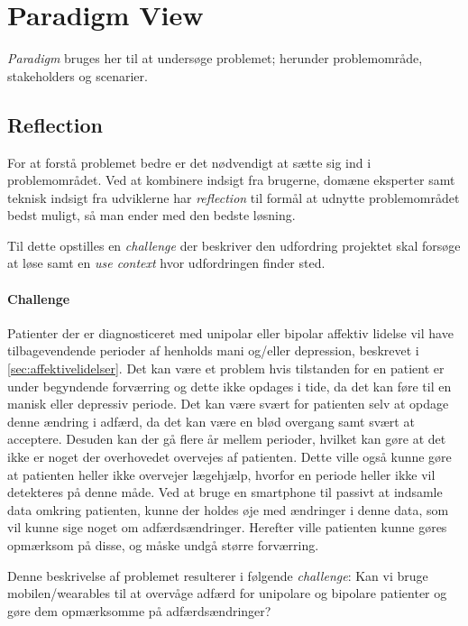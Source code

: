 

\section{Paradigm View}
\textit{Paradigm} bruges her til at undersøge problemet; herunder problemområde, stakeholders og scenarier.

\subsection{Reflection}
For at forstå problemet bedre er det nødvendigt at sætte sig ind i problemområdet.
Ved at kombinere indsigt fra brugerne, domæne eksperter samt teknisk indsigt fra udviklerne har \emph{reflection} til formål at udnytte problemområdet bedst muligt, så man ender med den bedste løsning.

Til dette opstilles en \emph{challenge} der beskriver den udfordring projektet skal forsøge at løse samt en \emph{use context} hvor udfordringen finder sted.

\paragraph{Challenge}\label{paradigm:challenge}
Patienter der er diagnosticeret med unipolar eller bipolar affektiv lidelse vil have tilbagevendende perioder af henholds mani og/eller depression, beskrevet i \cref{sec:affektivelidelser}.
Det kan være et problem hvis tilstanden for en patient er under begyndende forværring og dette ikke opdages i tide, da det kan føre til en manisk eller depressiv periode.
Det kan være svært for patienten selv at opdage denne ændring i adfærd, da det kan være en blød overgang samt svært at acceptere.
Desuden kan der gå flere år mellem perioder, hvilket kan gøre at det ikke er noget der overhovedet overvejes af patienten.
Dette ville også kunne gøre at patienten heller ikke overvejer lægehjælp, hvorfor en periode heller ikke vil detekteres på denne måde.
Ved at bruge en smartphone til passivt at indsamle data omkring patienten, kunne der holdes øje med ændringer i denne data, som vil kunne sige noget om adfærdsændringer.
Herefter ville patienten kunne gøres opmærksom på disse, og måske undgå større forværring.

Denne beskrivelse af problemet resulterer i følgende \emph{challenge}:
Kan vi bruge mobilen/wearables til at overvåge adfærd for unipolare og bipolare patienter og gøre dem opmærksomme på adfærdsændringer?

